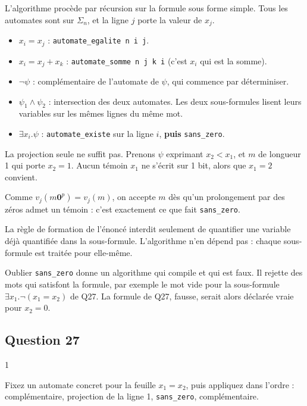 \documentclass[11pt,a4paper]{article}
\providecommand{\tightlist}{\setlength{\itemsep}{0pt}\setlength{\parskip}{0pt}}
\begin{document}
L'algorithme procède par récursion sur la formule sous forme simple. Tous les automates sont sur \(\Sigma_n\), et la ligne \(j\) porte la valeur de \(x_j\).

\begin{itemize}
\tightlist
\item
  \textbf{\(x_i=x_j\)} : \texttt{automate\_egalite\ n\ i\ j}.
\item
  \textbf{\(x_i=x_j+x_k\)} : \texttt{automate\_somme\ n\ j\ k\ i} (c'est \(x_i\) qui est la somme).
\item
  \textbf{\(\neg\psi\)} : complémentaire de l'automate de \(\psi\), qui commence par déterminiser.
\item
  \textbf{\(\psi_1\wedge\psi_2\)} : intersection des deux automates. Les deux sous-formules lisent leurs variables sur les mêmes lignes du même mot.
\item
  \textbf{\(\exists x_i.\psi\)} : \texttt{automate\_existe} sur la ligne \(i\), \textbf{puis} \texttt{sans\_zero}.
\end{itemize}

La projection seule ne suffit pas. Prenons \(\psi\) exprimant \(x_2<x_1\), et \(m\) de longueur 1 qui porte \(x_2=1\). Aucun témoin \(x_1\) ne s'écrit sur 1 bit, alors que \(x_1=2\) convient.

Comme \(v_j(m{\mathbf{0}}^p)=v_j(m)\), on accepte \(m\) dès qu'un prolongement par des zéros admet un témoin : c'est exactement ce que fait \texttt{sans\_zero}.

La règle de formation de l'énoncé interdit seulement de quantifier une variable déjà quantifiée dans la sous-formule. L'algorithme n'en dépend pas : chaque sous-formule est traitée pour elle-même.

\begin{piege}

Oublier \texttt{sans\_zero} donne un algorithme qui compile et qui est faux. Il rejette des mots qui satisfont la formule, par exemple le mot vide pour la sous-formule \(\exists x_1.\neg(x_1=x_2)\) de Q27. La formule de Q27, fausse, serait alors déclarée vraie pour \(x_2=0\).

\end{piege}

\hypertarget{question-27}{%
\subsection{Question 27}\label{question-27}}

\begin{indication}{1}

Fixez un automate concret pour la feuille \(x_1=x_2\), puis appliquez dans l'ordre : complémentaire, projection de la ligne 1, \texttt{sans\_zero}, complémentaire.

\end{indication}
\end{document}

